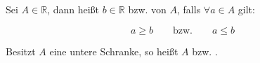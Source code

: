 Sei $A \in \mathbb{R}$, dann heißt $b \in \mathbb{R}$  bzw.  von $A$, falls $\forall a \in A$ gilt:

$$a \geq b \qquad \text{bzw.} \qquad a \leq b$$

Besitzt $A$ eine untere Schranke, so heißt $A$  bzw. .
